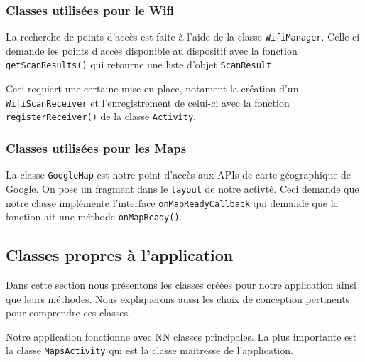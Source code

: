 \documentclass[12pt]{article}
\newcommand\code[1]{\texttt{#1}}
\begin{document}
\subsubsection{Classes utilisées pour le Wifi}

	La recherche de points d'accès est faite à l'aide de la classe
	\code{WifiManager}.  Celle-ci demande les points d'accès disponible au
	dispositif avec la fonction \code{getScanResults()} qui retourne une liste
	d'objet \code{ScanResult}.

	Ceci requiert une certaine mise-en-place, notament la création d'un
	\code{WifiScanReceiver} et l'enregistrement de celui-ci avec la fonction
	\code{registerReceiver()} de la classe \code{Activity}.

\subsubsection{Classes utilisées pour les Maps}

	La classe \code{GoogleMap} est notre point d'accès aux APIs de carte
	géographique de Google.  On pose un fragment dans le \code{layout} de notre
	activté.  Ceci demande que notre classe implémente l'interface
	\code{onMapReadyCallback} qui demande que la fonction ait une méthode
	\code{onMapReady()}.


\subsection{Classes propres à l'application}

	Dans cette section nous présentons les classes créées pour notre application
	ainsi que leurs méthodes.  Nous expliquerons aussi les choix de conception
	pertinents pour comprendre ces classes.

	Notre application fonctionne avec NN classes principales.  La plus
	importante est la classe \code{MapsActivity} qui est la classe maitresse de
	l'application.
\end{document}
